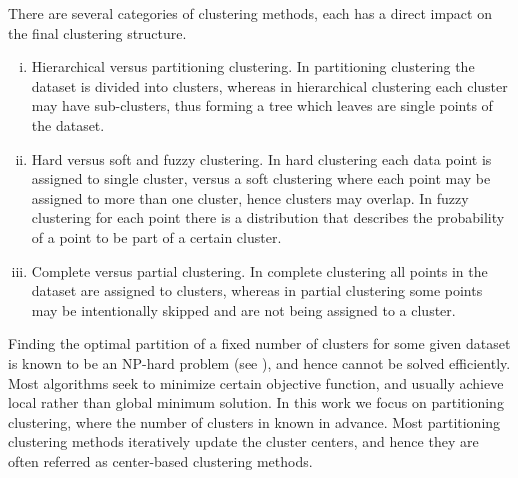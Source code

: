 There are several categories of clustering methods, each has a direct impact on the final clustering structure.
\begin{enumerate}[(i)]
	\item Hierarchical versus partitioning clustering. In partitioning clustering the dataset is divided into clusters, whereas in hierarchical clustering each cluster may have sub-clusters, thus forming a tree which leaves are single points of the dataset.
	\item Hard versus soft and fuzzy clustering. In hard clustering each data point is assigned to single cluster, versus a soft clustering where each point may be assigned to more than one cluster, hence clusters may overlap. In fuzzy clustering for each point there is a distribution that describes the probability of a point to be part of a certain cluster.
	\item Complete versus partial clustering. In complete clustering all points in the dataset are assigned to clusters, whereas in partial clustering some points may be intentionally skipped and are not being assigned to a cluster.
\end{enumerate}

Finding the optimal partition of a fixed number of clusters for some given dataset is known to be an NP-hard problem (see \cite{GJ1979}), and hence cannot be solved efficiently. Most algorithms seek to minimize certain objective function, and usually achieve local rather than global minimum solution. In this work we focus on partitioning clustering, where the number of clusters in known in advance. Most partitioning clustering methods iteratively update the cluster centers, and hence they are often referred as center-based clustering methods. \medskip

